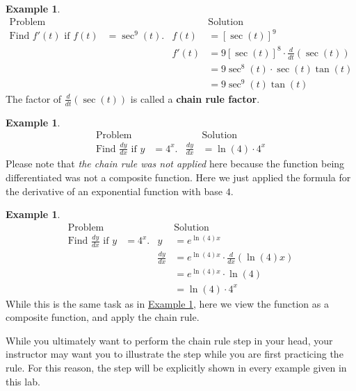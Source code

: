 \documentclass[12pt,]{book}
\newcommand{\terminology}[1]{\textbf{#1}}
\theoremstyle{plain}
\theoremstyle{definition}
\newtheorem{example}[theorem]{Example}
\numberwithin{equation}{section}
\newcommand{\fe}[2]{#1\mathopen{}\left(#2\right)\mathclose{}}
\newcommand{\fd}[1]{#1'}
\newcommand{\lz}[2]{\frac{d#1}{d#2}}
\newcommand{\lzoo}[2]{{\frac{d}{d#1}}{\left(#2\right)}}
\begin{document}
\begin{example}\label{example-second-chain-rule}
\begin{align*}
\text{Problem}&&&\text{Solution}\\
\text{Find }\fe{\fd{f}}{t}\text{ if }\fe{f}{t}&=\fe{\sec^9}{t}\text{.}&\fe{f}{t}&=\left[\fe{\sec}{t}\right]^9\\
&&\fe{\fd{f}}{t}&=9\left[\fe{\sec}{t}\right]^8\cdot\lzoo{t}{\fe{\sec}{t}}\\
&&&=9\fe{\sec^8}{t}\cdot\fe{\sec}{t}\fe{\tan}{t}\\
&&&=9\fe{\sec^9}{t}\fe{\tan}{t}
\end{align*}The factor of \(\lzoo{t}{\fe{\sec}{t}}\) is called a \terminology{chain rule factor}.%
\end{example}
\begin{example}\label{example-third-chain-rule}
\begin{align*}
\text{Problem}&&&\text{Solution}\\
\text{Find }\lz{y}{x}\text{ if }y&=4^x\text{.}&\lz{y}{x}&=\fe{\ln}{4}\cdot4^x
\end{align*}Please note that \emph{the chain rule was not applied} here because the function being differentiated was not a composite function. Here we just applied the formula for the derivative of an exponential function with base \(4\).%
\end{example}
\begin{example}\label{example-fourth-chain-rule}
\begin{align*}
\text{Problem}&&&\text{Solution}\\
\text{Find }\lz{y}{x}\text{ if }y&=4^x\text{.}&y&=e^{\fe{\ln}{4}x}\\
&&\lz{y}{x}&=e^{\fe{\ln}{4}x}\cdot\lzoo{x}{\fe{\ln}{4}x}\\
&&&=e^{\fe{\ln}{4}x}\cdot\fe{\ln}{4}\\
&&&=\fe{\ln}{4}\cdot4^{x}
\end{align*}While this is the same task as in \hyperref[example-third-chain-rule]{Example \ref{example-third-chain-rule}}, here we view the function as a composite function, and apply the chain rule.%
\end{example}
\par
While you ultimately want to perform the chain rule step in your head, your instructor may want you to illustrate the step while you are first practicing the rule.  For this reason, the step will be explicitly shown in every example given in this lab.%
\typeout{************************************************}
\typeout{************************************************}
\end{document}
